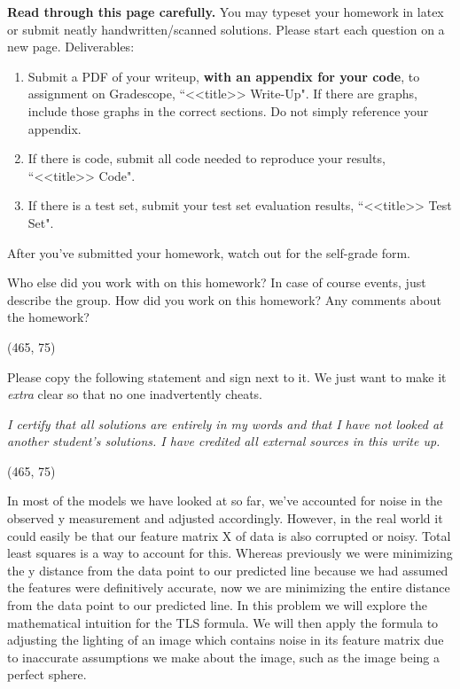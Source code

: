\documentclass[preview]{standalone}
\begin{document}
\fontsize{12}{15}\selectfont


\textbf{Read through this page carefully.} You may typeset your homework in latex or submit neatly handwritten/scanned solutions. Please start each question on a new page. Deliverables:

\begin{enumerate}
  \item Submit a PDF of your writeup, \textbf{with an appendix for your code}, to assignment on Gradescope, ``<<title>> Write-Up". If there are graphs, include those graphs in the correct sections. Do not simply reference your appendix.
  \item If there is code, submit all code needed to reproduce your results, ``<<title>> Code".
  \item If there is a test set, submit your test set evaluation results, ``<<title>> Test Set".
\end{enumerate}

After you've submitted your homework, watch out for the self-grade form.

\begin{Parts}

\Part Who else did you work with on this homework? In case of course events, just describe the group. How did you work on this homework? Any comments about the homework?

\vspace{15pt}
\framebox(465, 75){}

\Part Please copy the following statement and sign next to it. We just want to make it \textit{extra} clear so that no one inadvertently cheats.

\textit{I certify that all solutions are entirely in my words and that I have not looked at another student's solutions. I have credited all external sources in this write up.}

\vspace{15pt}
\framebox(465, 75){}

\end{Parts}

\pagebreak



In most of the models we have looked at so far, we've accounted for noise in the observed y measurement and adjusted accordingly. However, in the real world it could easily be that our feature matrix X of data is also corrupted or noisy. Total least squares is a way to account for this. Whereas previously we were minimizing the y distance from the data point to our predicted line because we had assumed the features were definitively accurate, now we are minimizing the entire distance from the data point to our predicted line. In this problem we will explore the mathematical intuition for the TLS formula. We will then apply the formula to adjusting the lighting of an image which contains noise in its feature matrix due to inaccurate assumptions we make about the image, such as the image being a perfect sphere.
\end{document}

